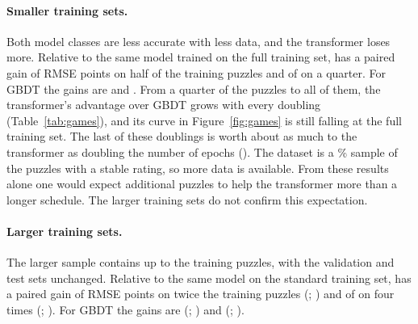\documentclass[11pt]{article}
\begin{document}
\paragraph{Smaller training sets.}
Both model classes are less accurate with less data, and the transformer
loses more. Relative to the same model trained on the full training set,
 has a paired gain of
 RMSE
points on half of the training puzzles and of
 on a
quarter. For GBDT the gains are  and
. From a quarter of the puzzles to
all of them, the transformer's advantage over GBDT grows with every doubling
(Table~\ref{tab:games}), and its curve in Figure~\ref{fig:games} is still
falling at the full training set.
\ifchangeepochs
The last of these doublings is worth about as much to the transformer as
doubling the number of epochs
().
\fi
The dataset is a \% sample of the puzzles with a
stable rating, so more data is available. From these results alone one would
expect additional puzzles to help the transformer more than a longer
schedule\ifmore. The larger training sets do not confirm this
expectation\fi.
\fi

\ifmore
\paragraph{Larger training sets.}
The larger sample contains up to  the training puzzles,
with the validation and test sets unchanged. Relative to the same model on
the standard training set,  has a paired gain of
 RMSE
points on twice the training puzzles
(;
) and of
 on
four times
(;
).
For GBDT the gains are 
(;
) and
(;
).
\end{document}
